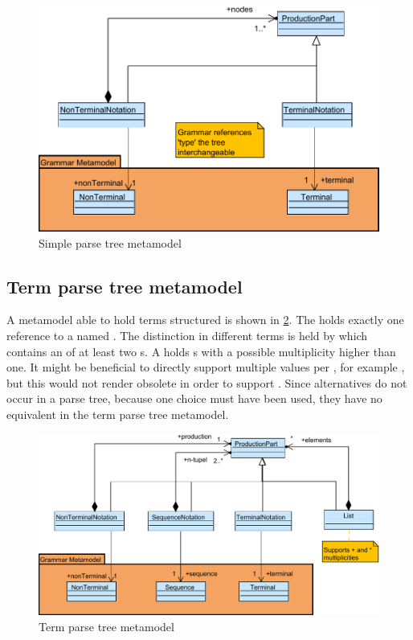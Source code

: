 \begin{figure}
\centering
\includegraphics[scale=0.75]{gfx/ex/Notation_ParseTree} 
\caption{Simple parse tree metamodel}
\label{MM:Not:PT}
\end{figure}

\subsection{Term parse tree metamodel} A metamodel able to hold terms structured is shown in \ref{MM:Not:TT}. The  holds exactly one reference to a  named . The distinction in different terms is held by  which contains an  of at least two s. A  holds s with a possible multiplicity higher than one. It might be beneficial to directly support multiple values per , for example , but this would not render  obsolete in order to support . Since alternatives do not occur in a parse tree, because one choice must have been used, they have no equivalent in the term parse tree metamodel. 

\begin{figure}
\centering
\includegraphics[scale=0.75]{gfx/ex/Notation_TermTree} 
\caption{Term parse tree metamodel}
\label{MM:Not:TT}
\end{figure}

